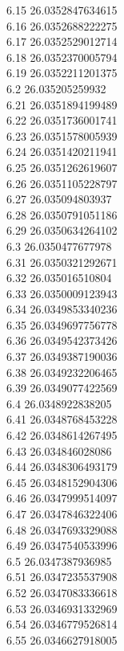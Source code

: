 {6.15	26.0352847634615\\
6.16	26.0352688222275\\
6.17	26.0352529012714\\
6.18	26.0352370005794\\
6.19	26.0352211201375\\
6.2	26.035205259932\\
6.21	26.0351894199489\\
6.22	26.0351736001741\\
6.23	26.0351578005939\\
6.24	26.0351420211941\\
6.25	26.0351262619607\\
6.26	26.0351105228797\\
6.27	26.035094803937\\
6.28	26.0350791051186\\
6.29	26.0350634264102\\
6.3	26.0350477677978\\
6.31	26.0350321292671\\
6.32	26.035016510804\\
6.33	26.0350009123943\\
6.34	26.0349853340236\\
6.35	26.0349697756778\\
6.36	26.0349542373426\\
6.37	26.0349387190036\\
6.38	26.0349232206465\\
6.39	26.0349077422569\\
6.4	26.0348922838205\\
6.41	26.0348768453228\\
6.42	26.0348614267495\\
6.43	26.034846028086\\
6.44	26.0348306493179\\
6.45	26.0348152904306\\
6.46	26.0347999514097\\
6.47	26.0347846322406\\
6.48	26.0347693329088\\
6.49	26.0347540533996\\
6.5	26.0347387936985\\
6.51	26.0347235537908\\
6.52	26.0347083336618\\
6.53	26.0346931332969\\
6.54	26.0346779526814\\
6.55	26.0346627918005\\
}
